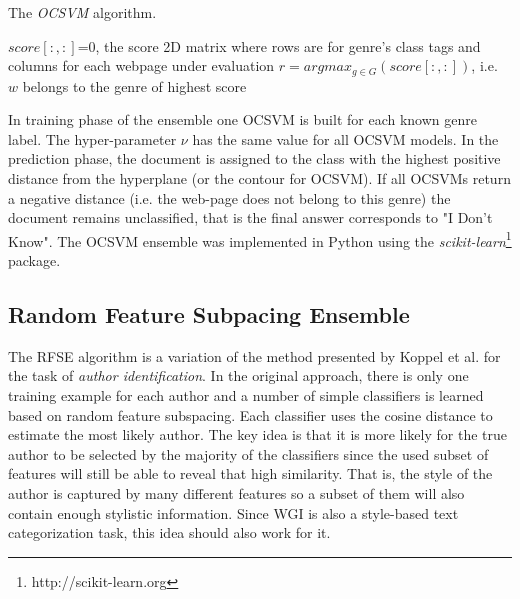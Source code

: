 \hfill \break

\begin{algorithm}[H]
\caption{The \textit{OCSVM} algorithm.}\label{alg:OCSVM-Ensemble}
$score[:, :]$=0, the score 2D matrix where rows are for genre's class tags and columns for each webpage under evaluation
{
        $r = argmax_{g \in G}(score[:, :])$, i.e. $w$ belongs to the genre of highest score\;
    }
\end{algorithm}

\hfill \break


In training phase of the ensemble one OCSVM is built for each known genre label. The hyper-parameter $\nu$ has the same value for all OCSVM models. In the prediction phase, the document is assigned to the class with the highest positive distance from the hyperplane (or the contour for OCSVM). If all OCSVMs return a negative distance (i.e. the web-page does not belong to this genre) the document remains unclassified, that is the final answer corresponds to "I Don't Know". The OCSVM ensemble was implemented in Python using the \textit{scikit-learn}\footnote{http://scikit-learn.org} package.

\subsection{Random Feature Subpacing Ensemble}\label{sec:RFSE_Description}

The RFSE algorithm is a variation of the method presented by Koppel et al. \citep{koppel2011authorship} for the task of \textit{author identification}. In the original approach, there is only one training example for each author and a number of simple classifiers is learned based on random feature subspacing. Each classifier uses the cosine distance to estimate the most likely author. The key idea is that it is more likely for the true author to be selected by the majority of the classifiers since the used subset of features will still be able to reveal that high similarity. That is, the style of the author is captured by many different features so a subset of them will also contain enough stylistic information. Since WGI is also a style-based text categorization task, this idea should also work for it.

